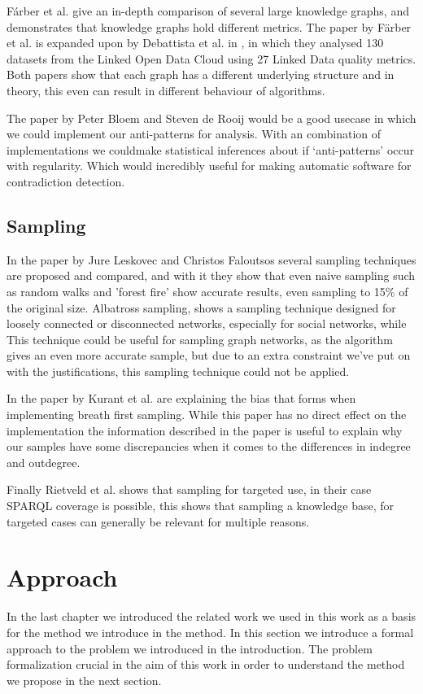\documentclass[11pt,letterpaper ,oneside ]{book}
\begin{document}
F\'arber et al. \cite{MichaelF:2017} give an in-depth comparison of several large knowledge graphs, and demonstrates that knowledge graphs hold different metrics. The paper by F\"arber et al. \cite{MichaelF:2017} is expanded upon by Debattista et al. in \cite{Debattista:2018}, in which they analysed 130 datasets from the Linked Open Data Cloud using 27 Linked Data quality metrics. Both papers show that each graph has a different underlying structure and in theory, this even can result in different behaviour of algorithms.

The paper by Peter Bloem and Steven de Rooij\cite{BloemP:2018} would be a good usecase in which we could implement our anti-patterns for analysis. With an combination of implementations we couldmake statistical inferences about if `anti-patterns' occur with regularity. Which would incredibly useful for making automatic software for contradiction detection.

\section{Sampling}
In the paper by Jure Leskovec and Christos Faloutsos \cite{Leskovec:2006} several sampling techniques are proposed and compared, and with it they show that even naive sampling such as random walks and 'forest fire' show accurate results, even sampling to 15\% of the original size. 
\cite{Jin:2011} Albatross sampling, shows a sampling technique designed for loosely connected or disconnected networks, especially for social networks, while
This technique could be useful for sampling graph networks, as the algorithm gives an even more accurate sample, but due to an extra constraint we've put on with the justifications, this sampling technique could not be applied.

In the paper by Kurant et al.\cite{Kurant:2011}  are explaining the bias that forms when implementing breath first sampling.
While this paper has no direct effect on the implementation the information described in the paper is useful to explain why our samples have some discrepancies when it comes to the differences in indegree and outdegree. 

Finally Rietveld et al.\cite{Rietveld:2014} shows that sampling for targeted use, in their case SPARQL coverage is possible, this shows that sampling a knowledge base, for targeted cases can generally be relevant for multiple reasons.


\newpage
\chapter{Approach}\label{ProblemDefintion}
In the last chapter we introduced the related work we used in this work as a basis for the method we introduce in the method. In this section we introduce a formal approach to the problem we introduced in the introduction. The problem formalization crucial in the aim of this work in order to understand the method we propose in the next section.
\end{document}
